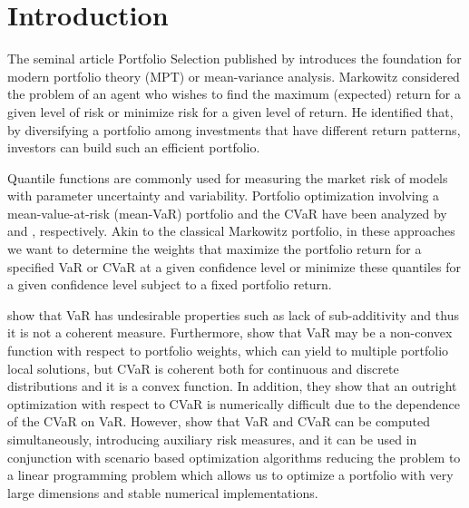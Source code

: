 \documentclass[a4paper,10pt]{article}
\begin{document}
\makeatother

 


\section{Introduction}

\label{introduction}

The seminal article Portfolio Selection published by  \citet*{
	markowitz1952} introduces the foundation for modern portfolio theory (MPT) or mean-variance analysis. Markowitz considered the problem of an agent who wishes to find the maximum (expected) return for a given level of risk or minimize risk for a given level of return. He identified that, by diversifying a portfolio among investments
that have different return patterns, investors can build such an efficient
portfolio.

Quantile functions are commonly used for measuring the market risk of models
with parameter uncertainty and variability. Portfolio optimization involving
a mean-value-at-risk (mean-VaR) portfolio and the CVaR have been analyzed by %
\citet*{alexander2002} and \citet*{rockafellar2000}, respectively. Akin to
the classical Markowitz portfolio, in these approaches we want to determine
the weights that maximize the portfolio return for a specified VaR or CVaR
at a given confidence level or minimize these quantiles for a given
confidence level subject to a fixed portfolio return.

\citet*{artzner1999} show that VaR has undesirable properties such as lack
of sub-additivity and thus it is not a coherent measure. Furthermore, \citet*%
{uryasev2001} show that VaR may be a non-convex function with respect to
portfolio weights, which can yield to multiple portfolio local solutions,
but CVaR is coherent both for continuous and discrete distributions and it
is a convex function. In addition, they show that an outright optimization
with respect to CVaR is numerically difficult due to the dependence of the
CVaR on VaR. However, \citet*{rockafellar2000} show that VaR and CVaR can be
computed simultaneously, introducing auxiliary risk measures, and it can be
used in conjunction with scenario based optimization algorithms reducing the
problem to a linear programming problem which allows us to optimize a
portfolio with very large dimensions and stable numerical implementations.
\end{document}
